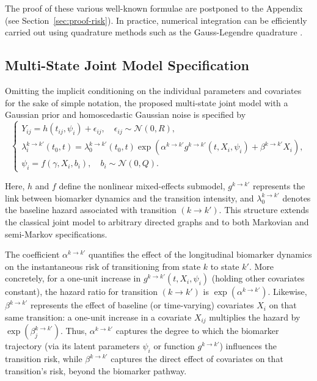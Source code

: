 \documentclass{sn-jnl}
\begin{document}
The proof of these various well-known formulae are postponed to the Appendix (see Section~\ref{sec:proof-risk}). In practice, numerical integration can be efficiently carried out using quadrature methods such as the Gauss-Legendre quadrature \citep{lether1978construction}.

\subsection{Multi-State Joint Model Specification}

Omitting the implicit conditioning on the individual parameters and covariates for the sake of simple notation, the proposed multi-state joint model with a Gaussian prior and homoscedastic Gaussian noise is specified by
\[
\begin{cases}
    Y_{ij} = h(t_{ij}, \psi_i) + \epsilon_{ij}, \quad \epsilon_{ij} \sim \mathcal{N}(0, R), \\
    \lambda_i^{k \to k'}(t_0, t) = \lambda_0^{k \to k'}(t_0, t) \exp\left( \alpha^{k \to k'} g^{k \to k'}(t, X_i, \psi_i) + \beta^{k \to k'} X_i \right), \\
    \psi_i = f(\gamma, X_i, b_i), \quad b_i \sim \mathcal{N}(0, Q).
\end{cases}
\]

Here, $h$ and $f$ define the nonlinear mixed-effects submodel,
$g^{k \to k'}$ represents the link between biomarker dynamics and the transition intensity, and $\lambda_0^{k \to k'}$ denotes the baseline hazard associated with transition $(k \to k')$. This structure extends the classical joint model to arbitrary directed graphs and to both Markovian and semi-Markov specifications. 

The coefficient $\alpha^{k \to k'}$ quantifies the effect of the longitudinal biomarker dynamics on the instantaneous risk of transitioning from state $k$ to state $k'$. More concretely, for a one-unit increase in $g^{k \to k'}(t,X_i,\psi_i)$ (holding other covariates constant), the hazard ratio for transition $(k \to k')$ is $\exp(\alpha^{k \to k'})$. Likewise, $\beta^{k \to k'}$ represents the effect of baseline (or time-varying) covariates $X_i$ on that same transition: a one-unit increase in a covariate $X_{ij}$ multiplies the hazard by $\exp(\beta^{k \to k'}_j)$. Thus, $\alpha^{k \to k'}$ captures the degree to which the biomarker trajectory (via its latent parameters $\psi_i$ or function $g^{k \to k'}$) influences the transition risk, while $\beta^{k \to k'}$ captures the direct effect of covariates on that transition’s risk, beyond the biomarker pathway.
\end{document}
